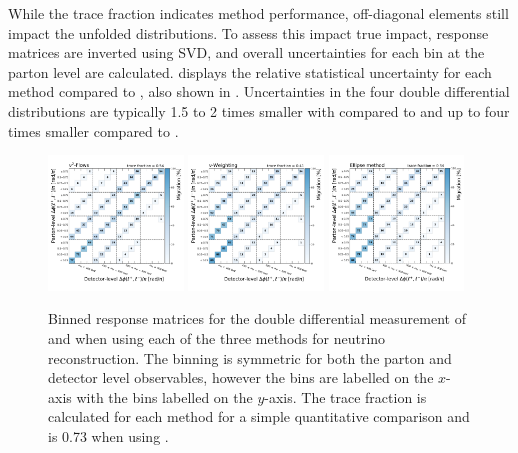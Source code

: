 While the trace fraction indicates method performance, off-diagonal elements still impact the unfolded distributions.
To assess this impact true impact, response matrices are inverted using SVD, and overall uncertainties for each bin at the parton level are calculated.
 displays the relative statistical uncertainty for each method compared to \vtruth, also shown in .
Uncertainties in the four double differential distributions are typically 1.5 to 2 times smaller with \vvflows compared to \vweight and up to four times smaller compared to \ellipse.

\begin{figure}[htp]
    \includegraphics[width=0.32\textwidth]{Figures/neutrino_unfolding/unfolding/unfold_lep_delphi_transformer_encoder.pdf}
    \includegraphics[width=0.32\textwidth]{Figures/neutrino_unfolding/unfolding/unfold_lep_delphi_nu_weighting.pdf}
    \includegraphics[width=0.32\textwidth]{Figures/neutrino_unfolding/unfolding/unfold_lep_delphi_nu_ellipse.pdf}
    \caption{Binned response matrices for the double differential measurement of \mttbar and \dphill when using each of the three methods for neutrino reconstruction. The binning is symmetric for both the parton and detector level observables, however the \mttbar bins are labelled on the $x$-axis with the \dphill bins labelled on the $y$-axis.
        The trace fraction is calculated for each method for a simple quantitative comparison and is 0.73 when using \vtruth.}
    \label{fig:unfold_dphill}
\end{figure}

